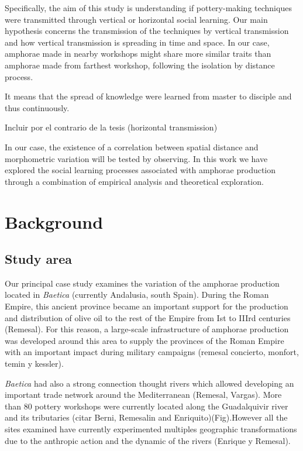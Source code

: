 \documentclass[review]{elsarticle}
\begin{document}
Specifically, the aim of this study is understanding if pottery-making techniques were transmitted through vertical or horizontal social learning. Our main hypothesis concerns the transmission of the techniques by vertical transmission and how vertical transmission is spreading in time and space. In our case, amphorae made in nearby workshops might share more similar traits than amphorae made from farthest workshop, following the isolation by distance process. 




It  means that the spread of knowledge were learned from master to disciple and thus continuously. 


Incluir por el contrario de la tesis (horizontal transmission)


In our case, the existence of a correlation between spatial distance and morphometric variation will be tested by observing. In this work we have explored the social learning processes associated with amphorae production through a combination of empirical analysis and theoretical exploration.





\section{Background}

\subsection{Study area}

Our principal case study examines the variation of the amphorae production located in \emph{Baetica} (currently Andalusia, south Spain). During the Roman Empire, this ancient province became an important support for the production and distribution of  olive oil to the rest of the Empire from Ist to IIIrd centuries (Remesal). 
For this reason, a large-scale infrastructure of amphorae production was developed around this area to supply the provinces of the Roman Empire with an important impact during military campaigns (remesal concierto, monfort, temin y kessler).

\emph{Baetica} had also a strong connection thought rivers which allowed developing an important trade network around the Mediterranean (Remesal, Vargas). More than 80 pottery workshops were currently located along the Guadalquivir river and its tributaries (citar Berni, Remesalin and Enriquito)(Fig).However all the sites examined have currently experimented multiples geographic transformations due to the anthropic action and the dynamic of the rivers (Enrique y Remesal). 
\end{document}
